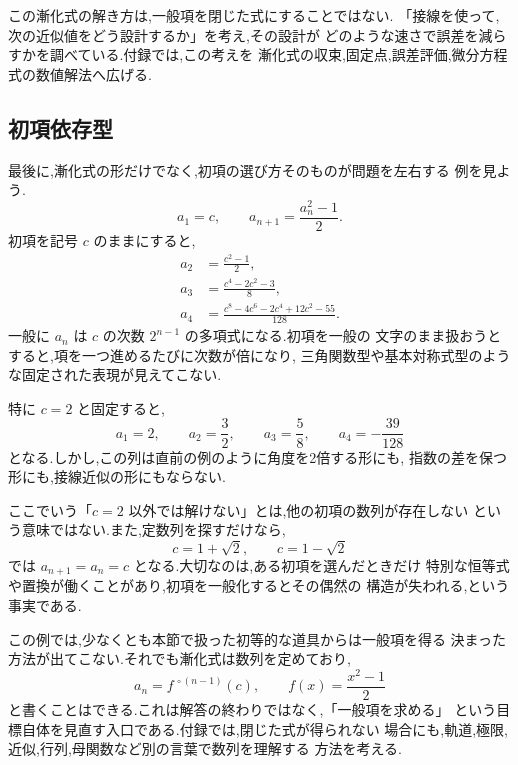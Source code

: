 この漸化式の解き方は,一般項を閉じた式にすることではない.
「接線を使って,次の近似値をどう設計するか」を考え,その設計が
どのような速さで誤差を減らすかを調べている.付録では,この考えを
漸化式の収束,固定点,誤差評価,微分方程式の数値解法へ広げる.

\subsection{初項依存型}

最後に,漸化式の形だけでなく,初項の選び方そのものが問題を左右する
例を見よう.
\[
  a_1=c,
  \qquad
  a_{n+1}=\frac{a_n^2-1}{2}.
  \tag{2.7.13}
\]
初項を記号 $c$ のままにすると,
\begin{align*}
  a_2&=\frac{c^2-1}{2},\\
  a_3&=\frac{c^4-2c^2-3}{8},\\
  a_4&=\frac{c^8-4c^6-2c^4+12c^2-55}{128}.
\end{align*}
一般に $a_n$ は $c$ の次数 $2^{n-1}$ の多項式になる.初項を一般の
文字のまま扱おうとすると,項を一つ進めるたびに次数が倍になり,
三角関数型や基本対称式型のような固定された表現が見えてこない.

特に $c=2$ と固定すると,
\[
  a_1=2,
  \qquad
  a_2=\frac{3}{2},
  \qquad
  a_3=\frac{5}{8},
  \qquad
  a_4=-\frac{39}{128}
\]
となる.しかし,この列は直前の例のように角度を2倍する形にも,
指数の差を保つ形にも,接線近似の形にもならない.

ここでいう「$c=2$ 以外では解けない」とは,他の初項の数列が存在しない
という意味ではない.また,定数列を探すだけなら,
\[
  c=1+\sqrt{2},
  \qquad
  c=1-\sqrt{2}
\]
では $a_{n+1}=a_n=c$ となる.大切なのは,ある初項を選んだときだけ
特別な恒等式や置換が働くことがあり,初項を一般化するとその偶然の
構造が失われる,という事実である.

この例では,少なくとも本節で扱った初等的な道具からは一般項を得る
決まった方法が出てこない.それでも漸化式は数列を定めており,
\[
  a_n=f^{\,\circ(n-1)}(c),
  \qquad
  f(x)=\frac{x^2-1}{2}
\]
と書くことはできる.これは解答の終わりではなく,「一般項を求める」
という目標自体を見直す入口である.付録では,閉じた式が得られない
場合にも,軌道,極限,近似,行列,母関数など別の言葉で数列を理解する
方法を考える.
